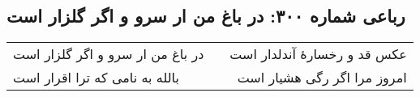 \begin{center}
\section*{رباعی شماره ۳۰۰: در باغ من ار سرو و اگر گلزار است}
\label{sec:0300}
\begin{longtable}{l p{0.5cm} r}
در باغ من ار سرو و اگر گلزار است
&&
عکس قد و رخسارهٔ آندلدار است
\\
بالله به نامی که ترا اقرار است
&&
امروز مرا اگر رگی هشیار است
\\
\end{longtable}
\end{center}
